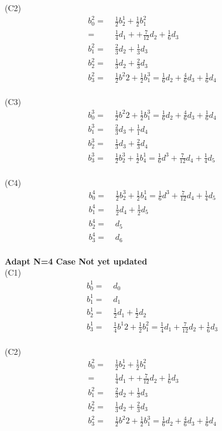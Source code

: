 \documentclass[12pt]{article}
\begin{document}
(C2)
\begin{align*}
b^{2}_{0} =&\; \frac{1}{2} b^{1}_{2} + \frac{1}{2} b^{2}_{1}\\
=&\; \frac{1}{4} d_1 + +\frac{7}{12}d_2 + \frac{1}{6}d_3 \\
b^{2}_{1} =&\; \frac{2}{3} d_2 + \frac{1}{3}d_3 \\
b^{2}_{2} =&\; \frac{1}{3} d_2 + \frac{2}{3}d_3 \\
b^{2}_{3} =&\; \frac{1}{2} b^{2}{2} + \frac{1}{2} b^{3}_{1} =\frac{1}{6}d_2 +\frac{4}{6}d_3 + \frac{1}{6}d_4 \\
\end{align*}

(C3)
\begin{align*}
b^{3}_{0} =&\; \frac{1}{2} b^{2}{2} + \frac{1}{2} b^{3}_{1} =\frac{1}{6}d_2 +\frac{4}{6}d_3 + \frac{1}{6}d_4 \\
b^{3}_{1} =&\; \frac{2}{3}d_3 + \frac{1}{1} d_4 \\
b^{3}_{2} =&\; \frac{1}{3}d_3 + \frac{2}{3} d_4 \\
b^{3}_{3} =&\; \frac{1}{2} b^{3}_{2} + \frac{1}{2}b^{1}_{4} = \frac{1}{6} d^{3} + \frac{7}{12} d_4 + \frac{1}{4} d_5\\
\end{align*}

(C4)
\begin{align*}
b^{4}_{0} =&\; \frac{1}{2} b^{3}_{2} + \frac{1}{2}b^{1}_{4} = \frac{1}{6} d^{3} + \frac{7}{12} d_4 + \frac{1}{4} d_5\\
b^{4}_{1} =&\; \frac{1}{2}d_4 + \frac{1}{2} d_5 \\
b^{4}_{2} =&\; d_5 \\
b^{4}_{3} =&\; d_6 \\
\end{align*}



\vspace {0.25cm}\noindent
{\bf Adapt N=4 Case Not yet updated} \\

(C1)
\begin{align*}
b^{1}_{0} =&\; d_0 \\
b^{1}_{1} =&\; d_1 \\
b^{1}_{2} =&\; \frac{1}{2} d_1 + \frac{1}{2}d_2 \\
b^{1}_{3} =&\; \frac{1}{4} b^{1}{2} + \frac{1}{2} b^{2}_{1} =\frac{1}{4}d_1 +\frac{7}{12}d_2 + \frac{1}{6}d_3 \\
\end{align*}

(C2)
\begin{align*}
b^{2}_{0} =&\; \frac{1}{2} b^{1}_{2} + \frac{1}{2} b^{2}_{1}\\
=&\; \frac{1}{4} d_1 + +\frac{7}{12}d_2 + \frac{1}{6}d_3 \\
b^{2}_{1} =&\; \frac{2}{3} d_2 + \frac{1}{3}d_3 \\
b^{2}_{2} =&\; \frac{1}{3} d_2 + \frac{2}{3}d_3 \\
b^{2}_{3} =&\; \frac{1}{2} b^{2}{2} + \frac{1}{2} b^{3}_{1} =\frac{1}{6}d_2 +\frac{4}{6}d_3 + \frac{1}{6}d_4 \\
\end{align*}
\end{document}
